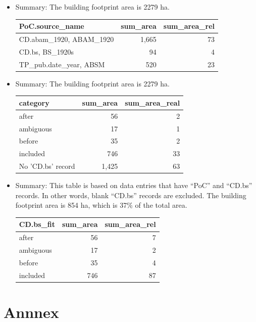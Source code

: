 \documentclass[
]{article}
\providecommand{\tightlist}{%
  \setlength{\itemsep}{0pt}\setlength{\parskip}{0pt}}
\begin{document}
\begin{itemize}
\tightlist
\item
  Summary: The building footprint area is 2279 ha.

  \begin{tabular}[t]{l|r|r}
  \hline
  PoC.source\_name & sum\_area & sum\_area\_rel\\
  \hline
  CD.abam\_1920,
  ABAM\_1920 & 1,665 & 73\\
  \hline
  CD.bs,
  BS\_1920s & 94 & 4\\
  \hline
  TP\_pub.date\_year,
  ABSM & 520 & 23\\
  \hline
  \end{tabular}
\item
  Summary: The building footprint area is 2279 ha.

  \begin{tabular}[t]{l|r|r}
  \hline
  category & sum\_area & sum\_area\_real\\
  \hline
  after & 56 & 2\\
  \hline
  ambiguous & 17 & 1\\
  \hline
  before & 35 & 2\\
  \hline
  included & 746 & 33\\
  \hline
  No 'CD.bs' record & 1,425 & 63\\
  \hline
  \end{tabular}
\item
  Summary: This table is based on data entries that have ``PoC'' and
  ``CD.bs'' records. In other words, blank ``CD.bs'' records are
  excluded. The building footprint area is 854 ha, which is 37\% of the
  total area.

  \begin{tabular}[t]{l|r|r}
  \hline
  CD.bs\_fit & sum\_area & sum\_area\_rel\\
  \hline
  after & 56 & 7\\
  \hline
  ambiguous & 17 & 2\\
  \hline
  before & 35 & 4\\
  \hline
  included & 746 & 87\\
  \hline
  \end{tabular}
\end{itemize}

\hypertarget{annnex}{%
\section*{Annnex}\label{annnex}}
\end{document}
